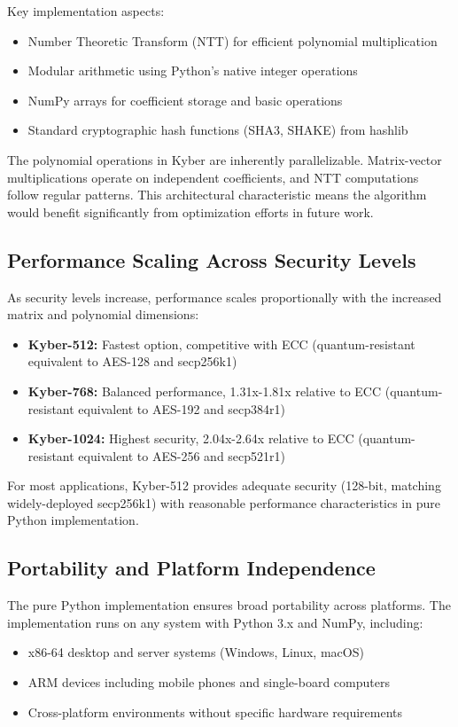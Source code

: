 Key implementation aspects:
\begin{itemize}
\item Number Theoretic Transform (NTT) for efficient polynomial multiplication
\item Modular arithmetic using Python's native integer operations
\item NumPy arrays for coefficient storage and basic operations
\item Standard cryptographic hash functions (SHA3, SHAKE) from hashlib
\end{itemize}

The polynomial operations in Kyber are inherently parallelizable. Matrix-vector multiplications operate on independent coefficients, and NTT computations follow regular patterns. This architectural characteristic means the algorithm would benefit significantly from optimization efforts in future work.

\subsection{Performance Scaling Across Security Levels}

As security levels increase, performance scales proportionally with the increased matrix and polynomial dimensions:

\begin{itemize}
\item \textbf{Kyber-512:} Fastest option, competitive with ECC (quantum-resistant equivalent to AES-128 and secp256k1)
\item \textbf{Kyber-768:} Balanced performance, 1.31x-1.81x relative to ECC (quantum-resistant equivalent to AES-192 and secp384r1)
\item \textbf{Kyber-1024:} Highest security, 2.04x-2.64x relative to ECC (quantum-resistant equivalent to AES-256 and secp521r1)
\end{itemize}

For most applications, Kyber-512 provides adequate security (128-bit, matching widely-deployed secp256k1) with reasonable performance characteristics in pure Python implementation.

\subsection{Portability and Platform Independence}

The pure Python implementation ensures broad portability across platforms. The implementation runs on any system with Python 3.x and NumPy, including:
\begin{itemize}
\item x86-64 desktop and server systems (Windows, Linux, macOS)
\item ARM devices including mobile phones and single-board computers
\item Cross-platform environments without specific hardware requirements
\end{itemize}

